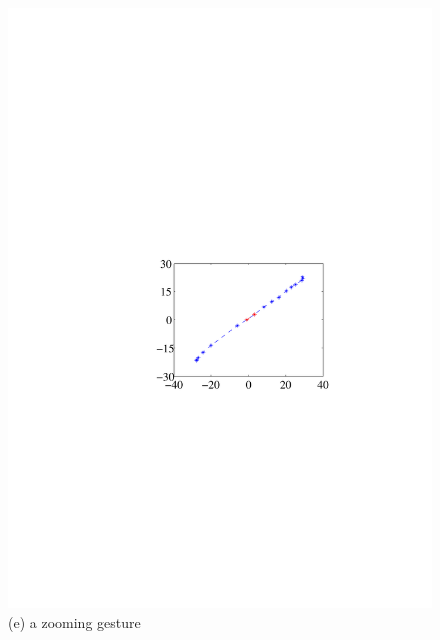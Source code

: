\begin{figure}[!t]
{\begin{minipage}[t]{0.19\textwidth}
            \includegraphics[width=\textwidth]{fig/gesture-distinction5.pdf}\\
            \centering  (e) a zooming gesture
            \end{minipage}
        }
        \hspace{0.25cm}
\end{figure}
